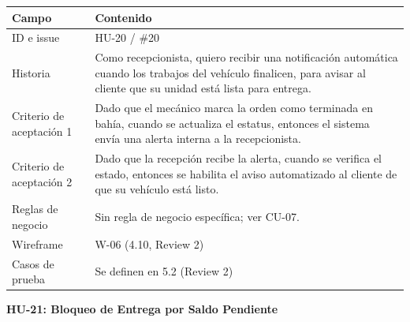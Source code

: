 {\def\LTcaptype{none} %
\begin{longtable}[]{@{}
  >{\raggedright\arraybackslash}p{}
  >{\raggedright\arraybackslash}p{}@{}}
\toprule\noalign{}
\begin{minipage}[b]{\linewidth}\raggedright
\textbf{Campo}
\end{minipage} & \begin{minipage}[b]{\linewidth}\raggedright
\textbf{Contenido}
\end{minipage} \\
\midrule\noalign{}
\endhead
\bottomrule\noalign{}
\endlastfoot
ID e issue & HU-20 / \#20 \\
Historia & Como recepcionista, quiero recibir una notificación
automática cuando los trabajos del vehículo finalicen, para avisar al
cliente que su unidad está lista para entrega. \\
Criterio de aceptación 1 & Dado que el mecánico marca la orden como
terminada en bahía, cuando se actualiza el estatus, entonces el sistema
envía una alerta interna a la recepcionista. \\
Criterio de aceptación 2 & Dado que la recepción recibe la alerta,
cuando se verifica el estado, entonces se habilita el aviso automatizado
al cliente de que su vehículo está listo. \\
Reglas de negocio & Sin regla de negocio específica; ver CU-07. \\
Wireframe & W-06 (4.10, Review 2) \\
Casos de prueba & Se definen en 5.2 (Review 2) \\
\end{longtable}
}

\textbf{HU-21: Bloqueo de Entrega por Saldo Pendiente}


